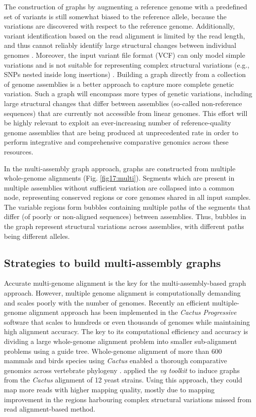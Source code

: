 \documentclass[../main.tex]{subfiles}
\begin{document}
The construction of graphs by augmenting a reference genome with a predefined set of variants  is still somewhat biased to the reference allele, because the variations are discovered with respect to the reference genome. Additionally, variant identification based on the read alignment is limited by the read length, and thus cannot reliably identify large structural changes between individual genomes \citep{feng2020higher}. Moreover, the input variant file format (VCF) can only model simple variations and is not suitable for representing complex structural variations (e.g., SNPs nested inside long insertions) \citep{letcher2021enabling}.  Building a graph directly from a collection of genome assemblies is a better approach to capture more complete genetic variation. Such a graph will encompass more types of genetic variations, including large structural changes that differ between assemblies (so-called non-reference sequences) that are currently not accessible from linear genomes. This effort will be highly relevant to exploit an ever-increasing number of reference-quality genome assemblies that are being produced at unprecedented rate in order to perform integrative and comprehensive comparative genomics across these resources. 

In the multi-assembly graph approach, graphs are constructed from  multiple whole-genome alignments (Fig. \ref{fig17:multi}). Segments which are present in multiple assemblies without sufficient variation are collapsed into a common node, representing conserved regions or core genomes shared in all input samples. The variable regions form bubbles containing multiple paths of the segments that differ (of poorly or non-aligned sequences) between assemblies. Thus, bubbles in the graph represent structural variations across assemblies, with different paths being different alleles. 

\subsection*{Strategies to build multi-assembly graphs}

Accurate multi-genome alignment is the key for the multi-assembly-based graph approach. However, multiple genome alignment is computationally demanding and scales poorly with the number of genomes. Recently an efficient multiple-genome alignment approach has been implemented in the \emph{Cactus Progressive} software \citep{armstrong2020progressive} that scales to hundreds or even  thousands of genomes while maintaining high alignment accuracy. The key to its computational efficiency and accuracy is dividing a large whole-genome alignment problem into smaller sub-alignment problems using a guide tree. Whole-genome alignment of more than 600 mammals and birds species using \emph{Cactus} enabled a thorough comparative genomics across vertebrate phylogeny \citep{feng2020dense,Genereux2020}.
\citet{hickey2020genotyping} applied the \emph{vg toolkit} to induce graphs from the \emph{Cactus} alignment of 12 yeast strains. Using this approach, they could map more reads with higher mapping quality, mostly due to mapping improvement in the regions harbouring complex structural variations missed from read alignment-based method. 
\end{document}
